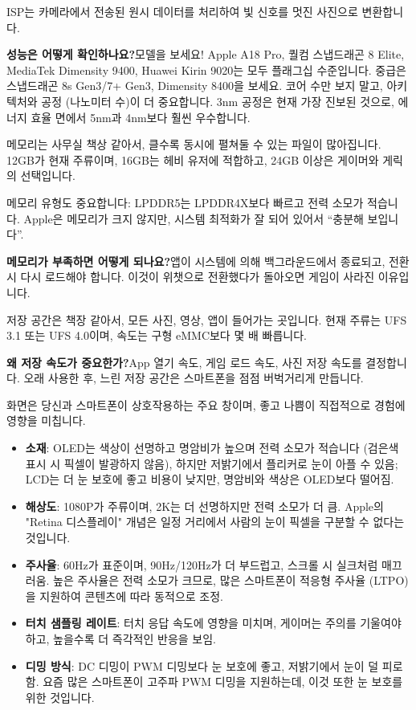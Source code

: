 
ISP는 카메라에서 전송된 원시 데이터를 처리하여 빛 신호를 멋진 사진으로 변환합니다.

\textbf{성능은 어떻게 확인하나요?}모델을 보세요! Apple A18 Pro, 퀄컴 스냅드래곤 8 Elite, MediaTek Dimensity 9400, Huawei Kirin 9020는 모두 플래그십 수준입니다. 중급은 스냅드래곤 8s Gen3/7+ Gen3, Dimensity 8400을 보세요. 코어 수만 보지 말고, 아키텍처와 공정 (나노미터 수)이 더 중요합니다. 3nm 공정은 현재 가장 진보된 것으로, 에너지 효율 면에서 5nm과 4nm보다 훨씬 우수합니다.


메모리는 사무실 책상 같아서, 클수록 동시에 펼쳐둘 수 있는 파일이 많아집니다. 12GB가 현재 주류이며, 16GB는 헤비 유저에 적합하고, 24GB 이상은 게이머와 게릭의 선택입니다.

메모리 유형도 중요합니다: LPDDR5는 LPDDR4X보다 빠르고 전력 소모가 적습니다. Apple은 메모리가 크지 않지만, 시스템 최적화가 잘 되어 있어서 “충분해 보입니다”.

\textbf{메모리가 부족하면 어떻게 되나요?}앱이 시스템에 의해 백그라운드에서 종료되고, 전환 시 다시 로드해야 합니다. 이것이 위챗으로 전환했다가 돌아오면 게임이 사라진 이유입니다.


저장 공간은 책장 같아서, 모든 사진, 영상, 앱이 들어가는 곳입니다. 현재 주류는 UFS 3.1 또는 UFS 4.0이며, 속도는 구형 eMMC보다 몇 배 빠릅니다.

\textbf{왜 저장 속도가 중요한가?}App 열기 속도, 게임 로드 속도, 사진 저장 속도를 결정합니다. 오래 사용한 후, 느린 저장 공간은 스마트폰을 점점 버벅거리게 만듭니다.


화면은 당신과 스마트폰이 상호작용하는 주요 창이며, 좋고 나쁨이 직접적으로 경험에 영향을 미칩니다.

\begin{itemize}
  \item \textbf{소재}: OLED는 색상이 선명하고 명암비가 높으며 전력 소모가 적습니다 (검은색 표시 시 픽셀이 발광하지 않음), 하지만 저밝기에서 플리커로 눈이 아플 수 있음; LCD는 더 눈 보호에 좋고 비용이 낮지만, 명암비와 색상은 OLED보다 떨어짐.
  \item \textbf{해상도}: 1080P가 주류이며, 2K는 더 선명하지만 전력 소모가 더 큼. Apple의 "Retina 디스플레이" 개념은 일정 거리에서 사람의 눈이 픽셀을 구분할 수 없다는 것입니다.
  \item \textbf{주사율}: 60Hz가 표준이며, 90Hz/120Hz가 더 부드럽고, 스크롤 시 실크처럼 매끄러움. 높은 주사율은 전력 소모가 크므로, 많은 스마트폰이 적응형 주사율 (LTPO)을 지원하여 콘텐츠에 따라 동적으로 조정.
  \item \textbf{터치 샘플링 레이트}: 터치 응답 속도에 영향을 미치며, 게이머는 주의를 기울여야 하고, 높을수록 더 즉각적인 반응을 보임.
  \item \textbf{디밍 방식}: DC 디밍이 PWM 디밍보다 눈 보호에 좋고, 저밝기에서 눈이 덜 피로함. 요즘 많은 스마트폰이 고주파 PWM 디밍을 지원하는데, 이것 또한 눈 보호를 위한 것입니다.
\end{itemize}

